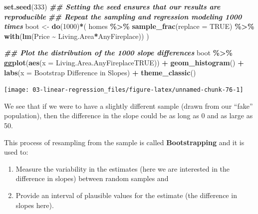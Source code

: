 \documentclass[
]{book}
\newenvironment{Shaded}{\begin{snugshade}}{\end{snugshade}}
\newcommand{\AttributeTok}[1]{\textcolor[rgb]{0.13,0.29,0.53}{#1}}
\newcommand{\ConstantTok}[1]{\textcolor[rgb]{0.56,0.35,0.01}{#1}}
\newcommand{\DecValTok}[1]{\textcolor[rgb]{0.00,0.00,0.81}{#1}}
\newcommand{\DocumentationTok}[1]{\textcolor[rgb]{0.56,0.35,0.01}{\textbf{\textit{#1}}}}
\newcommand{\FunctionTok}[1]{\textcolor[rgb]{0.13,0.29,0.53}{\textbf{#1}}}
\newcommand{\NormalTok}[1]{#1}
\newcommand{\OtherTok}[1]{\textcolor[rgb]{0.56,0.35,0.01}{#1}}
\newcommand{\SpecialCharTok}[1]{\textcolor[rgb]{0.81,0.36,0.00}{\textbf{#1}}}
\newcommand{\StringTok}[1]{\textcolor[rgb]{0.31,0.60,0.02}{#1}}
\providecommand{\tightlist}{%
  \setlength{\itemsep}{0pt}\setlength{\parskip}{0pt}}
\begin{document}
\begin{Shaded}
\begin{Highlighting}[]
\FunctionTok{set.seed}\NormalTok{(}\DecValTok{333}\NormalTok{) }\DocumentationTok{\#\# Setting the seed ensures that our results are reproducible}
\DocumentationTok{\#\# Repeat the sampling and regression modeling 1000 times}
\NormalTok{boot }\OtherTok{\textless{}{-}} \FunctionTok{do}\NormalTok{(}\DecValTok{1000}\NormalTok{)}\SpecialCharTok{*}\NormalTok{(}
\NormalTok{    homes }\SpecialCharTok{\%\textgreater{}\%}
    \FunctionTok{sample\_frac}\NormalTok{(}\AttributeTok{replace =} \ConstantTok{TRUE}\NormalTok{) }\SpecialCharTok{\%\textgreater{}\%}
    \FunctionTok{with}\NormalTok{(}\FunctionTok{lm}\NormalTok{(Price }\SpecialCharTok{\textasciitilde{}}\NormalTok{ Living.Area}\SpecialCharTok{*}\NormalTok{AnyFireplace))}
\NormalTok{)}

\DocumentationTok{\#\# Plot the distribution of the 1000 slope differences}
\NormalTok{boot }\SpecialCharTok{\%\textgreater{}\%}
    \FunctionTok{ggplot}\NormalTok{(}\FunctionTok{aes}\NormalTok{(}\AttributeTok{x =}\NormalTok{ Living.Area.AnyFireplaceTRUE)) }\SpecialCharTok{+}
    \FunctionTok{geom\_histogram}\NormalTok{() }\SpecialCharTok{+}
    \FunctionTok{labs}\NormalTok{(}\AttributeTok{x =} \StringTok{\textquotesingle{}Bootstrap Difference in Slopes\textquotesingle{}}\NormalTok{) }\SpecialCharTok{+}
    \FunctionTok{theme\_classic}\NormalTok{()}
\end{Highlighting}
\end{Shaded}

\begin{center}\texttt{[image: 03-linear-regression\_files/figure-latex/unnamed-chunk-76-1]} \end{center}

We see that if we were to have a slightly different sample (drawn from our ``fake'' population), then the difference in the slope could be as long as 0 and as large as 50.

This process of resampling from the sample is called \textbf{Bootstrapping} and it is used to:

\begin{enumerate}
\def\labelenumi{\arabic{enumi}.}
\tightlist
\item
  Measure the variability in the estimates (here we are interested in the difference in slopes) between random samples and
\item
  Provide an interval of plausible values for the estimate (the difference in slopes here).
\end{enumerate}
\end{document}
